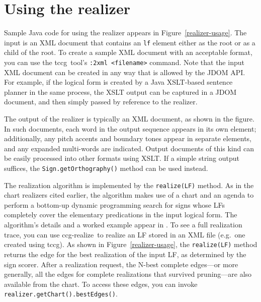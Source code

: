 \documentclass[11pt]{article}
\newcommand{\tccg}{\textsf{tccg}}
\newcommand{\ccgrz}{\textsf{ccg-realize}}
\newcommand{\code}[1]{\texttt{#1}} %
\begin{document}
\section{Using the realizer}

Sample Java code for using the realizer appears in
Figure~\ref{realizer-usage}. The input is an XML document that contains
an \code{lf} element either as the root or as a child of the root. To
create a sample XML document with an acceptable format, you can use the
\tccg\ tool's \code{:2xml <filename>} command. Note that the
input XML document can be created in any way that is allowed by the JDOM
API. For example, if the logical form is created by a Java XSLT-based
sentence planner in the same process, the XSLT output can be captured in
a JDOM document, and then simply passed by reference to the realizer.

The output of the realizer is typically an XML document, as shown in the
figure. In such documents, each word in the output sequence appears in
its own element; additionally, any pitch accents and boundary tones
appear in separate elements, and any expanded multi-words are indicated.
Output documents of this kind can be easily processed into other formats
using XSLT.  If a simple string output suffices, the
\code{Sign.getOrthography()} method can be used instead.

The realization algorithm is implemented by the \code{realize(LF)} method.
As in the chart realizers cited earlier, the algorithm makes use of a
chart and an agenda to perform a bottom-up dynamic programming search
for signs whose LFs completely cover the elementary predications in the
input logical form. The algorithm's details and a worked example appear
in \cite{White-RLAC:2004,White-INLG:2004}. To see a full realization
trace, you can use \ccgrz\ to realize an LF stored in an XML file (e.g.\
one created using \tccg). As shown in Figure~\ref{realizer-usage}, the
\code{realize(LF)} method returns the edge for the best realization of the
input LF, as determined by the sign scorer. After a realization request,
the N-best complete edges---or more generally, all the edges for
complete realizations that survived pruning---are also available from
the chart. To access these edges, you can invoke
\code{realizer.getChart().bestEdges()}.
\end{document}
